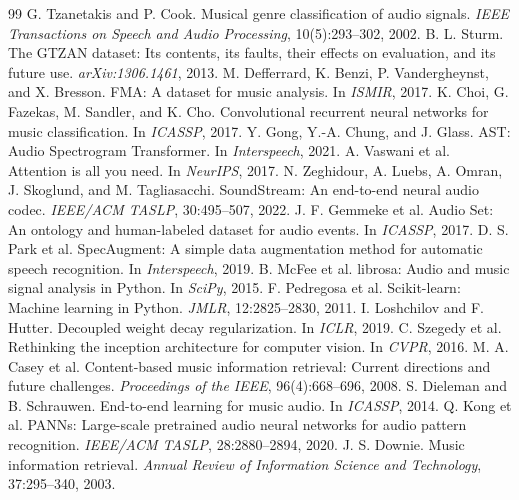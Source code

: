 \documentclass[UTF8,10pt,a4paper]{ctexart}
\begin{document}
\begin{thebibliography}{99}\small
{} G. Tzanetakis and P. Cook. Musical genre classification of audio signals. \emph{IEEE Transactions on Speech and Audio Processing}, 10(5):293--302, 2002.
 B. L. Sturm. The GTZAN dataset: Its contents, its faults, their effects on evaluation, and its future use. \emph{arXiv:1306.1461}, 2013.
 M. Defferrard, K. Benzi, P. Vandergheynst, and X. Bresson. FMA: A dataset for music analysis. In \emph{ISMIR}, 2017.
 K. Choi, G. Fazekas, M. Sandler, and K. Cho. Convolutional recurrent neural networks for music classification. In \emph{ICASSP}, 2017.
 Y. Gong, Y.-A. Chung, and J. Glass. AST: Audio Spectrogram Transformer. In \emph{Interspeech}, 2021.
 A. Vaswani et al. Attention is all you need. In \emph{NeurIPS}, 2017.
 N. Zeghidour, A. Luebs, A. Omran, J. Skoglund, and M. Tagliasacchi. SoundStream: An end-to-end neural audio codec. \emph{IEEE/ACM TASLP}, 30:495--507, 2022.
 J. F. Gemmeke et al. Audio Set: An ontology and human-labeled dataset for audio events. In \emph{ICASSP}, 2017.
 D. S. Park et al. SpecAugment: A simple data augmentation method for automatic speech recognition. In \emph{Interspeech}, 2019.
 B. McFee et al. librosa: Audio and music signal analysis in Python. In \emph{SciPy}, 2015.
 F. Pedregosa et al. Scikit-learn: Machine learning in Python. \emph{JMLR}, 12:2825--2830, 2011.
 I. Loshchilov and F. Hutter. Decoupled weight decay regularization. In \emph{ICLR}, 2019.
 C. Szegedy et al. Rethinking the inception architecture for computer vision. In \emph{CVPR}, 2016.
 M. A. Casey et al. Content-based music information retrieval: Current directions and future challenges. \emph{Proceedings of the IEEE}, 96(4):668--696, 2008.
 S. Dieleman and B. Schrauwen. End-to-end learning for music audio. In \emph{ICASSP}, 2014.
 Q. Kong et al. PANNs: Large-scale pretrained audio neural networks for audio pattern recognition. \emph{IEEE/ACM TASLP}, 28:2880--2894, 2020.
 J. S. Downie. Music information retrieval. \emph{Annual Review of Information Science and Technology}, 37:295--340, 2003.

\end{thebibliography}
\end{document}

